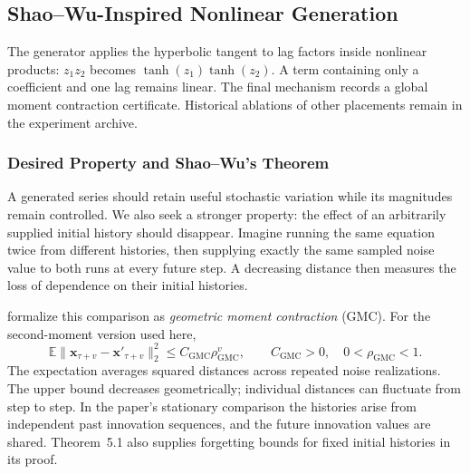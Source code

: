 \subsection{Shao--Wu-Inspired Nonlinear Generation}
\label{sec:implemented-shao-wu}

The generator applies the hyperbolic tangent to lag factors inside
nonlinear products: $z_1z_2$ becomes $\tanh(z_1)\tanh(z_2)$.
A term containing only a coefficient and one lag remains linear.
The final mechanism records a global moment contraction certificate.
Historical ablations of other placements remain in the experiment archive.

\subsubsection{Desired Property and Shao--Wu's Theorem}
\label{sec:implemented-shao-wu-theory}
A generated series should retain useful stochastic variation while its
magnitudes remain controlled. We also seek a stronger property: the effect
of an arbitrarily supplied initial history should disappear. Imagine running
the same equation twice from different histories, then supplying exactly the
same sampled noise value to both runs at every future step. A decreasing
distance then measures the loss of dependence on their initial histories.

\citet[Section~3, Eq.~(3.1), electronic reprint p.~5]{shao2007spectral}
formalize this comparison as \emph{geometric moment contraction} (GMC).
For the second-moment version used here,
\begin{equation}
 \mathbb E\|\mathbf x_{\tau+v}-\mathbf x'_{\tau+v}\|_2^2
 \leq C_{\mathrm{GMC}}\rho_{\mathrm{GMC}}^{v},
 \qquad C_{\mathrm{GMC}}>0,\quad 0<\rho_{\mathrm{GMC}}<1.
 \label{eq:implemented-gmc-forgetting}
\end{equation}
The expectation averages squared distances across repeated noise
realizations. The upper bound decreases geometrically; individual
distances can fluctuate from step to step. In the paper's stationary
comparison the histories arise from independent past innovation sequences,
and the future innovation values are shared. Theorem~5.1 also supplies
forgetting bounds for fixed initial histories in its proof.

